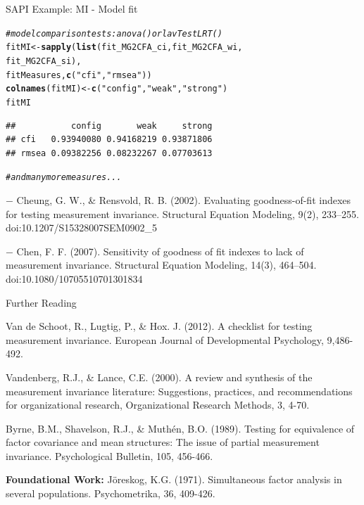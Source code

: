 \documentclass[10pt]{beamer}\usepackage[]{graphicx}\usepackage[]{xcolor}
\makeatletter
\newcommand{\hlstr}[1]{\textcolor[rgb]{0.192,0.494,0.8}{#1}}%
\newcommand{\hlcom}[1]{\textcolor[rgb]{0.678,0.584,0.686}{\textit{#1}}}%
\newcommand{\hlstd}[1]{\textcolor[rgb]{0.345,0.345,0.345}{#1}}%
\newcommand{\hlkwb}[1]{\textcolor[rgb]{0.69,0.353,0.396}{#1}}%
\newcommand{\hlkwd}[1]{\textcolor[rgb]{0.737,0.353,0.396}{\textbf{#1}}}%
\newenvironment{kframe}{%
 \def\at@end@of@kframe{}%
 \ifinner\ifhmode%
  \def\at@end@of@kframe{\end{minipage}}%
  \begin{minipage}{\columnwidth}%
 \fi\fi%
 \def\FrameCommand##1{\hskip\@totalleftmargin \hskip-\fboxsep
 \colorbox{shadecolor}{##1}\hskip-\fboxsep
     \hskip-\linewidth \hskip-\@totalleftmargin \hskip\columnwidth}%
 \MakeFramed {\advance\hsize-\width
   \@totalleftmargin\z@ \linewidth\hsize
   \@setminipage}}%
 {\par\unskip\endMakeFramed%
 \at@end@of@kframe}
\newenvironment{knitrout}{}{} %
\makeatother
\begin{document}
\begin{frame}[fragile]{SAPI Example: MI - Model fit}

\begin{knitrout}
\color{fgcolor}\begin{kframe}
\begin{alltt}
\hlcom{# model comparison tests: anova() or lavTestLRT()}
\hlstd{fitMI} \hlkwb{<-} \hlkwd{sapply}\hlstd{(}\hlkwd{list}\hlstd{(fit_MG2CFA_ci, fit_MG2CFA_wi,}
                     \hlstd{fit_MG2CFA_si),}
                \hlstd{fitMeasures,} \hlkwd{c}\hlstd{(}\hlstr{"cfi"}\hlstd{,} \hlstr{"rmsea"}\hlstd{))}
\hlkwd{colnames}\hlstd{(fitMI)} \hlkwb{<-} \hlkwd{c}\hlstd{(}\hlstr{"config"}\hlstd{,} \hlstr{"weak"}\hlstd{,} \hlstr{"strong"}\hlstd{)}
\hlstd{fitMI}
\end{alltt}
\begin{verbatim}
##           config       weak     strong
## cfi   0.93940080 0.94168219 0.93871806
## rmsea 0.09382256 0.08232267 0.07703613
\end{verbatim}
\begin{alltt}
\hlcom{# and many more measures...}
\end{alltt}
\end{kframe}
\end{knitrout}

\footnotesize{
$-$ Cheung, G. W., \& Rensvold, R. B. (2002). Evaluating goodness-of-fit indexes for testing measurement invariance. Structural Equation Modeling, 9(2), 233–255. doi:10.1207/S15328007SEM0902\_5


$-$ Chen, F. F. (2007). Sensitivity of goodness of fit indexes to lack of measurement invariance. Structural Equation Modeling, 14(3), 464–504. doi:10.1080/10705510701301834
}
\end{frame}
%
\begin{frame}{Further Reading}

Van de Schoot, R., Lugtig, P., \& Hox. J. (2012). A checklist for testing measurement invariance. European Journal of Developmental Psychology, 9,486-492. 

\vspace{5mm}

Vandenberg, R.J., \& Lance, C.E. (2000). A review and synthesis of the measurement invariance literature: Suggestions, practices, and recommendations for organizational research, Organizational Research Methods, 3, 4-70. 

\vspace{5mm}

Byrne, B.M., Shavelson, R.J., \& Muthén, B.O. (1989). Testing for equivalence of factor covariance and mean structures: The issue of partial measurement invariance. Psychological Bulletin, 105, 456-466. 

\vspace{5mm}

\textbf{Foundational Work:} Jöreskog, K.G. (1971). Simultaneous factor analysis in several populations. Psychometrika, 36, 409-426.

\end{frame}
\end{document}

